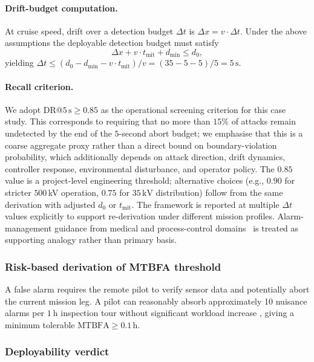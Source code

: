 \documentclass{ieeeaccess}
\begin{document}
\paragraph{Drift-budget computation.}
At cruise speed, drift over a detection budget $\Delta t$ is
$\Delta x = v \cdot \Delta t$. Under the above assumptions the deployable
detection budget must satisfy
\begin{equation}
  \Delta x + v \cdot t_{\text{mit}} + d_{\min} \leq d_{0},
\end{equation}
yielding $\Delta t \leq (d_0 - d_{\min} - v \cdot t_{\text{mit}})/v
= (35-5-5)/5 = 5\,\text{s}$.

\paragraph{Recall criterion.}
We adopt DR@$5\,\text{s} \geq 0.85$ as the operational screening criterion
for this case study. This corresponds to requiring that no more than $15\%$
of attacks remain undetected by the end of the $5$-second abort budget; we
emphasise that this is a coarse aggregate proxy rather than a direct bound on
boundary-violation probability, which additionally depends on attack
direction, drift dynamics, controller response, environmental disturbance,
and operator policy. The $0.85$ value is a project-level engineering
threshold; alternative choices (e.g., $0.90$ for stricter $500$\,kV
operation, $0.75$ for $35\,\text{kV}$ distribution) follow from the same
derivation with adjusted $d_0$ or $t_{\text{mit}}$. The framework is
reported at multiple $\Delta t$ values explicitly to support re-derivation
under different mission profiles. Alarm-management guidance from
medical and process-control domains~\cite{ref32} is treated as
supporting analogy rather than primary basis.

\subsubsection{Risk-based derivation of MTBFA threshold}

A false alarm requires the remote pilot to verify sensor data and potentially
abort the current mission leg.
A pilot can reasonably absorb approximately 10 nuisance alarms per
$\SI{1}{\hour}$ inspection tour without significant workload increase
\cite{ref32,ref10}, giving a minimum tolerable $\text{MTBFA} \geq 0.1\,\text{h}$.

\subsubsection{Deployability verdict}
\end{document}

